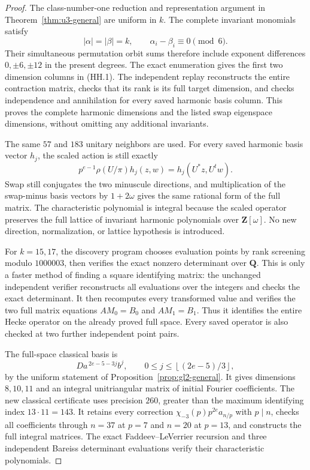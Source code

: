 \documentclass[11pt,a4paper]{article}
\theoremstyle{definition}
\begin{document}
\begin{proof}
The class-number-one reduction and representation argument in
Theorem~\ref{thm:u3-general} are uniform in \(k\).
The complete invariant monomials satisfy
\[
 |\alpha|=|\beta|=k,\qquad
 \alpha_i-\beta_i\equiv0\pmod6.
\]
Their simultaneous permutation orbit sums therefore include exponent
differences \(0,\pm6,\pm12\) in the present degrees.
The exact enumeration gives the first two dimension columns in (HH.1).
The independent replay reconstructs the entire contraction matrix,
checks that its rank is its full target dimension, and checks
independence and annihilation for every saved harmonic basis column.
This proves the complete harmonic dimensions and the listed swap
eigenspace dimensions, without omitting any additional invariants.

The same \(57\) and \(183\) unitary neighbors are used.
For every saved harmonic basis vector \(h_j\), the scaled action is
still exactly
\[
 p^{e-1}\rho(U/\pi)h_j(z,w)=h_j(U^*z,U^tw).
\]
Swap still conjugates the two minuscule directions, and multiplication
of the swap-minus basis vectors by \(1+2\omega\) gives the same rational
form of the full matrix. The characteristic polynomial is integral
because the scaled operator preserves the full lattice of invariant
harmonic polynomials over \(\mathbf Z[\omega]\). No new direction,
normalization, or lattice hypothesis is introduced.

For \(k=15,17\), the discovery program chooses evaluation
points by rank screening modulo \(1000003\), then verifies the exact
nonzero determinant over \(\mathbf Q\). This is only a faster method
of finding a square identifying matrix: the unchanged independent
verifier reconstructs all evaluations over the integers and checks
the exact determinant. It then recomputes every transformed value
and verifies the two full matrix equations \(AM_0=B_0\) and
\(AM_1=B_1\). Thus it identifies the entire Hecke operator on the
already proved full space. Every saved operator is also checked at
two further independent point pairs.

The full-space classical basis is
\[
 Da^{\,2e-5-3j}b^j,\qquad
 0\le j\le\left\lfloor(2e-5)/3\right\rfloor ,
\]
by the uniform statement of Proposition~\ref{prop:gl2-general}.
It gives dimensions \(8,10,11\) and an integral unitriangular matrix
of initial Fourier coefficients. The new classical certificate uses
precision \(260\), greater than the maximum identifying index
\(13\cdot11=143\). It retains every correction
\(\chi_{-3}(p)p^{2e}a_{n/p}\) with \(p\mid n\), checks all coefficients
through \(n=37\) at \(p=7\) and \(n=20\) at \(p=13\), and constructs
the full integral matrices. The exact Faddeev--LeVerrier recursion
and three independent Bareiss determinant evaluations verify their
characteristic polynomials.


\end{proof}
\end{document}
